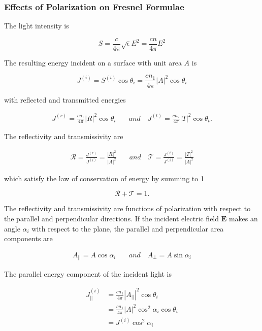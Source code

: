 \subsubsection{Effects of Polarization on Fresnel Formulae}
The light intensity is

\begin{equation}
    S = \frac{c}{4\pi} \sqrt{\epsilon} E^2 = \frac{cn}{4\pi} E^2
\end{equation}

The resulting energy incident on a surface with unit area $A$ is

\begin{equation}
    J^{(i)} = S^{(i)} \cos{\theta_i} = \frac{cn_1}{4\pi} |A|^2 \cos{\theta_i}
\end{equation}

with reflected and transmitted energies

\begin{align}
    J^{(r)} = \frac{cn_1}{4\pi} |R|^2 \cos{\theta_i} & \quad and \quad J^{(t)} = \frac{cn_2}{4\pi} |T|^2 \cos{\theta_t}.
\end{align}

The reflectivity and transmissivity are

\begin{align}
    \mathcal{R} = \frac{J^{(r)}}{J^{(i)}} = \frac{|R|^2}{|A|^2} & \quad and \quad \mathcal{T} = \frac{J^{(t)}}{J^{(i)}} = \frac{|T|^2}{|A|^2}
\end{align}

which satisfy the law of conservation of energy by summing to 1

\begin{equation}
    \mathcal{R} + \mathcal{T} = 1.
\end{equation}

The reflectivity and transmissivity are functions of polarization with respect to the parallel and perpendicular directions. If the incident electric field $\mathbf{E}$ makes an angle $\alpha_i$ with respect to the plane, the parallel and perpendicular area components are

\begin{align}
    A_{||} = A \cos{\alpha_i} & \quad and \quad A_{\perp} = A \sin{\alpha_i}
\end{align}

The parallel energy component of the incident light is

\begin{align}
    J_{||}^{(i)} &= \frac{cn_1}{4\pi} |A_{||}|^2 \cos{\theta_i} \nonumber \\
    &= \frac{cn_1}{4\pi} |A |^2 \cos^2{\alpha_i} \cos{\theta_i} \nonumber \\
    &= J^{(i)} \cos^2{\alpha_i}
\end{align}

